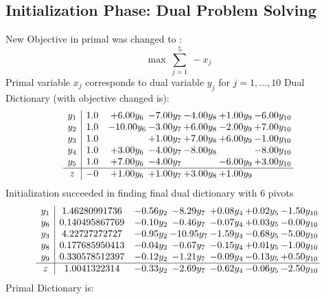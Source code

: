\documentclass[8pt]{article}
\begin{document}
\subsection{Initialization Phase: Dual Problem Solving}
New Objective in primal was changed to : \[ \max\ \sum_{j=1}^{5}\ - x_j \] 
Primal variable $x_j$ corresponds to dual variable $y_j$ for $j = 1,\ldots,10$
Dual Dictionary (with objective changed is): 
\[\begin{array}{c| c c@{\hskip 2pt} c@{\hskip 2pt} c@{\hskip 2pt} c@{\hskip 2pt} c@{\hskip 2pt} }
 y_{1}   &  1.0 & +  6.00 y_{6} & -7.00 y_{7} & -4.00 y_{8} & +  1.00 y_{9} & -6.00 y_{10}\\
 y_{2}   &  1.0 & -10.00 y_{6} & -3.00 y_{7} & +  6.00 y_{8} & -2.00 y_{9} & +  7.00 y_{10}\\
 y_{3}   &  1.0  &   & +  1.00 y_{7} & +  7.00 y_{8} & +  6.00 y_{9} & -1.00 y_{10}\\
 y_{4}   &  1.0 & +  3.00 y_{6} & -4.00 y_{7} & -8.00 y_{8} &   & -8.00 y_{10}\\
 y_{5}   &  1.0 & +  7.00 y_{6} & -4.00 y_{7} &   & -6.00 y_{9} & +  3.00 y_{10}\\
\hline
z    &  -0 & +  1.00 y_{6} & +  1.00 y_{7} & +  3.00 y_{8} & +  1.00 y_{9} &   \\
\end{array}\]
Initialization succeeded in finding final dual dictionary with 6 pivots
\[\begin{array}{c| c c@{\hskip 2pt} c@{\hskip 2pt} c@{\hskip 2pt} c@{\hskip 2pt} c@{\hskip 2pt} }
 y_{1}   &  1.46280991736 & -0.56 y_{2} & -8.29 y_{7} & +  0.08 y_{4} & +  0.02 y_{5} & -1.50 y_{10}\\
 y_{6}   &  0.140495867769 & -0.10 y_{2} & -0.46 y_{7} & -0.07 y_{4} & +  0.03 y_{5} & -0.00 y_{10}\\
 y_{3}   &  4.22727272727 & -0.95 y_{2} & -10.95 y_{7} & -1.59 y_{4} & -0.68 y_{5} & -5.00 y_{10}\\
 y_{8}   &  0.177685950413 & -0.04 y_{2} & -0.67 y_{7} & -0.15 y_{4} & +  0.01 y_{5} & -1.00 y_{10}\\
 y_{9}   &  0.330578512397 & -0.12 y_{2} & -1.21 y_{7} & -0.09 y_{4} & -0.13 y_{5} & +  0.50 y_{10}\\
\hline
z    &  1.0041322314 & -0.33 y_{2} & -2.69 y_{7} & -0.62 y_{4} & -0.06 y_{5} & -2.50 y_{10}\\
\end{array}\]
Primal Dictionary is:
\end{document}
